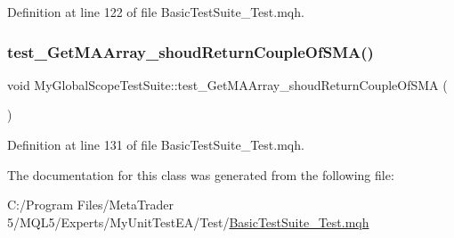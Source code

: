 Definition at line 122 of file Basic\+Test\+Suite\+\_\+\+Test.\+mqh.

\mbox{\label{class_my_global_scope_test_suite_a0b70c8c23cd8d6595cac8f6b7da3cc07}} 
\subsubsection{\texorpdfstring{test\+\_\+\+Get\+M\+A\+Array\+\_\+shoud\+Return\+Couple\+Of\+S\+M\+A()}{test\_GetMAArray\_shoudReturnCoupleOfSMA()}}
{\footnotesize\ttfamily void My\+Global\+Scope\+Test\+Suite\+::test\+\_\+\+Get\+M\+A\+Array\+\_\+shoud\+Return\+Couple\+Of\+S\+MA (\begin{DoxyParamCaption}{ }\end{DoxyParamCaption})\hspace{0.3cm}{\ttfamily [inline]}}



Definition at line 131 of file Basic\+Test\+Suite\+\_\+\+Test.\+mqh.



The documentation for this class was generated from the following file\+:\begin{DoxyCompactItemize}
\item 
C\+:/\+Program Files/\+Meta\+Trader 5/\+M\+Q\+L5/\+Experts/\+My\+Unit\+Test\+E\+A/\+Test/\mbox{\hyperlink{_basic_test_suite___test_8mqh}{Basic\+Test\+Suite\+\_\+\+Test.\+mqh}}\end{DoxyCompactItemize}
